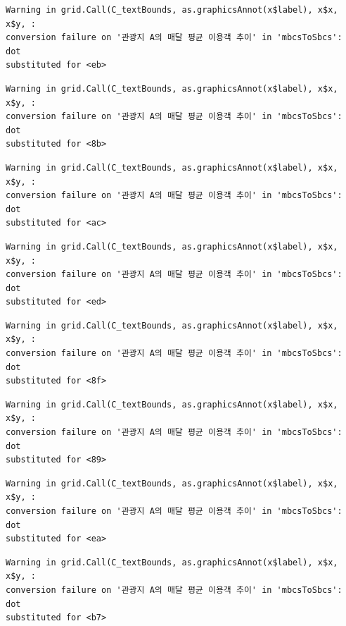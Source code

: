 \documentclass[
  letterpaper,
  DIV=11,
  numbers=noendperiod]{scrreprt}
\begin{document}
\begin{verbatim}
Warning in grid.Call(C_textBounds, as.graphicsAnnot(x$label), x$x, x$y, :
conversion failure on '관광지 A의 매달 평균 이용객 추이' in 'mbcsToSbcs': dot
substituted for <eb>
\end{verbatim}

\begin{verbatim}
Warning in grid.Call(C_textBounds, as.graphicsAnnot(x$label), x$x, x$y, :
conversion failure on '관광지 A의 매달 평균 이용객 추이' in 'mbcsToSbcs': dot
substituted for <8b>
\end{verbatim}

\begin{verbatim}
Warning in grid.Call(C_textBounds, as.graphicsAnnot(x$label), x$x, x$y, :
conversion failure on '관광지 A의 매달 평균 이용객 추이' in 'mbcsToSbcs': dot
substituted for <ac>
\end{verbatim}

\begin{verbatim}
Warning in grid.Call(C_textBounds, as.graphicsAnnot(x$label), x$x, x$y, :
conversion failure on '관광지 A의 매달 평균 이용객 추이' in 'mbcsToSbcs': dot
substituted for <ed>
\end{verbatim}

\begin{verbatim}
Warning in grid.Call(C_textBounds, as.graphicsAnnot(x$label), x$x, x$y, :
conversion failure on '관광지 A의 매달 평균 이용객 추이' in 'mbcsToSbcs': dot
substituted for <8f>
\end{verbatim}

\begin{verbatim}
Warning in grid.Call(C_textBounds, as.graphicsAnnot(x$label), x$x, x$y, :
conversion failure on '관광지 A의 매달 평균 이용객 추이' in 'mbcsToSbcs': dot
substituted for <89>
\end{verbatim}

\begin{verbatim}
Warning in grid.Call(C_textBounds, as.graphicsAnnot(x$label), x$x, x$y, :
conversion failure on '관광지 A의 매달 평균 이용객 추이' in 'mbcsToSbcs': dot
substituted for <ea>
\end{verbatim}

\begin{verbatim}
Warning in grid.Call(C_textBounds, as.graphicsAnnot(x$label), x$x, x$y, :
conversion failure on '관광지 A의 매달 평균 이용객 추이' in 'mbcsToSbcs': dot
substituted for <b7>
\end{verbatim}
\end{document}
